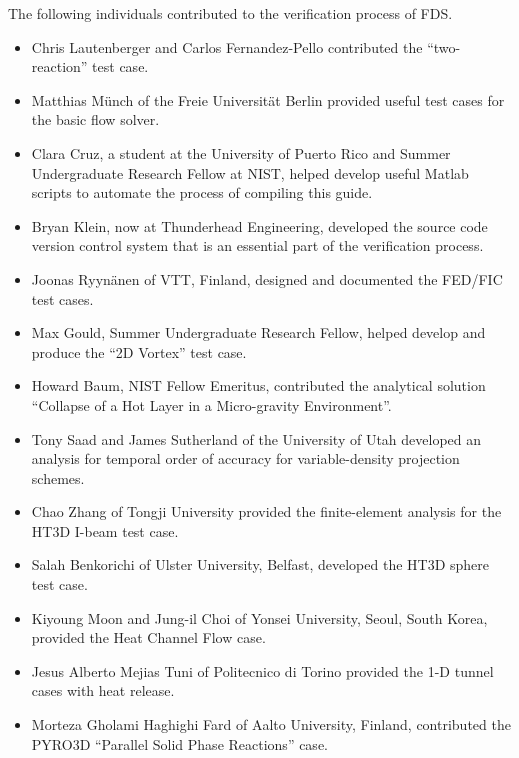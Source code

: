 \documentclass[11pt]{book}
\begin{document}
The following individuals contributed to the verification process of FDS.
\begin{itemize}
\item Chris Lautenberger and Carlos Fernandez-Pello contributed the ``two-reaction'' test case.
\item Matthias M\"{u}nch of the Freie Universit\"{a}t Berlin provided useful test cases for the basic flow solver.
\item Clara Cruz, a student at the University of Puerto Rico and Summer Undergraduate Research Fellow at NIST, helped develop useful Matlab scripts to automate the process of compiling this guide.
\item Bryan Klein, now at Thunderhead Engineering, developed the source code version control system that is an essential part of the verification process.
\item Joonas Ryyn\"{a}nen of VTT, Finland, designed and documented the FED/FIC test cases.
\item Max Gould, Summer Undergraduate Research Fellow, helped develop and produce the ``2D Vortex'' test case.
\item Howard Baum, NIST Fellow Emeritus, contributed the analytical solution ``Collapse of a Hot Layer in a Micro-gravity Environment''.
\item Tony Saad and James Sutherland of the University of Utah developed an analysis for temporal order of accuracy for variable-density projection schemes.
\item Chao Zhang of Tongji University provided the finite-element analysis for the HT3D I-beam test case.
\item Salah Benkorichi of Ulster University, Belfast, developed the HT3D sphere test case.
\item Kiyoung Moon and Jung-il Choi of Yonsei University, Seoul, South Korea, provided the Heat Channel Flow case.
\item Jesus Alberto Mejias Tuni of Politecnico di Torino provided the 1-D tunnel cases with heat release.
\item Morteza Gholami Haghighi Fard of Aalto University, Finland, contributed the PYRO3D ``Parallel Solid Phase Reactions'' case.
\end{itemize}


\cleardoublepage
{}
{}
\tableofcontents

\cleardoublepage
{}
{}
\listoffigures
\end{document}
